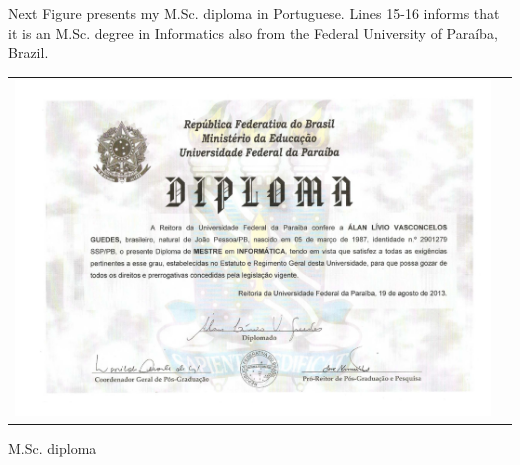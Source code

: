 \documentclass[10pt,a4paper,sans,colorlinks]{moderncv}
\begin{document}
Next Figure presents my M.Sc. diploma in Portuguese.
Lines 15-16 informs that it is an M.Sc. degree in Informatics also from the Federal University of Paraíba, Brazil.

\begin{Figure}
  \begin{tabularx}{\textwidth}{X p{1cm}}
    \includegraphics[align=t,width=\textwidth, keepaspectratio]{../static/certificates/msc-diploma.pdf}
  \end{tabularx}
  \caption{M.Sc. diploma}
\end{Figure}


\newpage
\end{document}
